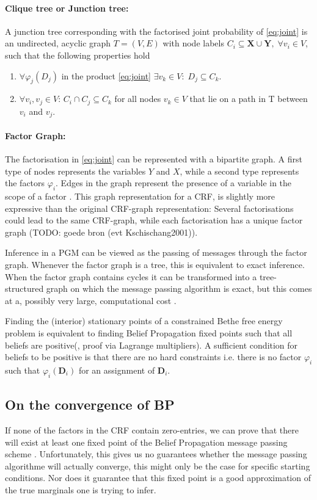 \paragraph{Clique tree or Junction tree:} A junction tree corresponding with the factorised joint probability of \eqref{eq:joint} is an undirected, acyclic graph $T = (V,E)$ with node labels $C_i \subseteq \mathbf{X} \cup \mathbf{Y}, \; \forall v_i \in V$, such that the following properties hold \cite{Aji2000} 
\begin{enumerate}
	\item $\forall \varphi_j(D_j)$ in the product \eqref{eq:joint} $\exists v_k \in V:\; D_j \subseteq C_k$. 
	\item $\forall v_i,v_j \in V$: $C_i \cap C_j \subseteq C_k$ for all nodes $v_k \in V$ that lie on a path in T between $v_i$ and $v_j$.
\end{enumerate} 

\paragraph{Factor Graph:} 
The factorisation in \eqref{eq:joint} can be represented with a bipartite graph. A first type of nodes represents the variables $Y$ and $X$, while a second type represents the factors $\varphi_i$. Edges in the graph represent the presence of a variable in the scope of a factor \cite{Kschischang2001}. This graph representation for a CRF, is slightly more expressive than the original CRF-graph representation: Several factorisations could lead to the same CRF-graph, while each factorisation has a unique factor graph (TODO: goede bron (evt Kschischang2001)).

Inference in a PGM can be viewed as the passing of messages through the factor graph. Whenever the factor graph is a tree, this is equivalent to exact inference. When the factor graph contains cycles it can be transformed into a tree-structured graph on which the message passing algorithm is exact, but this comes at a, possibly very large, computational cost \citep{Yedidia2005}.

Finding the (interior) stationary points of a constrained Bethe free energy problem is equivalent to finding Belief Propagation fixed points such that all beliefs are positive(\citep{Yedidia2005}, proof via Lagrange multipliers). A sufficient condition for beliefs to be positive is that there are no hard constraints i.e. there is no factor $\varphi_i$ such that $\varphi_i(\mathbf{D}_i)$ for an assignment of $\mathbf{D}_i$.

\subsection{On the convergence of BP}
If none of the factors in the CRF contain zero-entries, we can prove that there  will exist at least one fixed point of the Belief Propagation message passing scheme \citep{Yedidia2005}. Unfortunately, this gives us no guarantees whether the message passing algorithme will actually converge, this might only be the case for specific starting conditions. Nor does it guarantee that this fixed point is a good approximation of the true marginals one is trying to infer.

